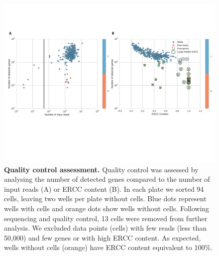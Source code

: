 \begin{figure}
    \centering
    \includegraphics[width=\textwidth]{"SF2"}
    \caption[Quality control assessment]{\textbf{Quality control assessment.} Quality control was assessed by analysing the number of detected genes compared to the number of input reads (A) or ERCC content (B). In each plate we sorted 94 cells, leaving two wells per plate without cells. Blue dots represent wells with cells and orange dots show wells without cells. Following sequencing and quality control, 13 cells were removed from further analysis. We excluded data points (cells) with few reads (less than 50,000) and few genes or with high ERCC content. As expected, wells without cells (orange) have ERCC content equivalent to 100\%.}
    \label{fig:qc}
\end{figure}

